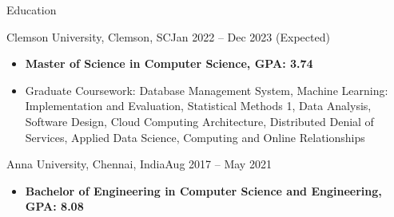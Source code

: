 \documentclass[]{mcdowellcv}
\begin{document}
	\makeheader
	


\begin{cvsection}{Education}
		\begin{cvsubsection}{Clemson University, Clemson, SC}{}{Jan 2022 -- Dec 2023 (Expected)}
			\begin{itemize}
				\item \textbf {Master of Science in Computer Science, GPA: 3.74}
				\item {Graduate Coursework: Database Management System, Machine Learning: Implementation and Evaluation, Statistical Methods 1, Data Analysis, Software Design, Cloud Computing Architecture, Distributed Denial of Services, Applied Data Science, Computing and Online Relationships } 
			\end{itemize}
		\end{cvsubsection}
		\begin{cvsubsection}{Anna University, Chennai, India}{}{Aug 2017 -- May 2021}
			\begin{itemize}
				\item \textbf{Bachelor of Engineering in Computer Science and Engineering, GPA: 8.08}
			\end{itemize}
		\end{cvsubsection}
	\end{cvsection}
\end{document}
